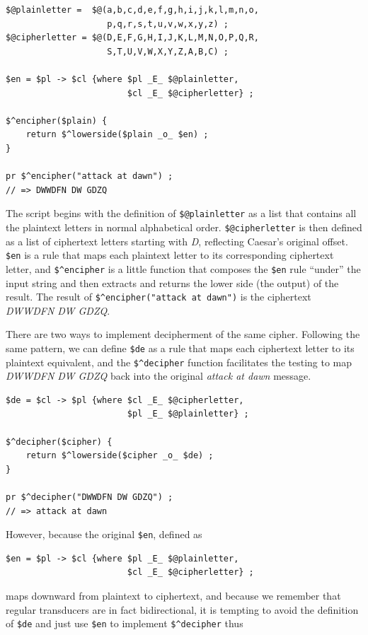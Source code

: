 \begin{Verbatim}
$@plainletter =  $@(a,b,c,d,e,f,g,h,i,j,k,l,m,n,o,
                    p,q,r,s,t,u,v,w,x,y,z) ;
$@cipherletter = $@(D,E,F,G,H,I,J,K,L,M,N,O,P,Q,R,
                    S,T,U,V,W,X,Y,Z,A,B,C) ;

$en = $pl -> $cl {where $pl _E_ $@plainletter,
                        $cl _E_ $@cipherletter} ;

$^encipher($plain) {
    return $^lowerside($plain _o_ $en) ;
}

pr $^encipher("attack at dawn") ;
// => DWWDFN DW GDZQ
\end{Verbatim}



The script begins with the definition of \texttt{\$@plainletter} as a list that contains all the plaintext letters in
normal alphabetical order.  \texttt{\$@cipherletter} is then defined as a list of ciphertext letters starting with \emph{D},
reflecting Caesar's original offset.
\texttt{\$en} is a rule that maps each plaintext letter to its corresponding ciphertext letter, and \verb!$^encipher! is a
little function that composes the \verb!$en! rule ``under'' the input string and then extracts and returns the lower side
(the output) of the result.  The result of \verb!$^encipher("attack at dawn")! is the ciphertext \emph{DWWDFN DW GDZQ}.

There are two ways to implement decipherment of the same cipher.  Following the same pattern, we can define \verb!$de! as
a rule that maps each ciphertext letter to its plaintext equivalent, and the \verb!$^decipher! function facilitates the
testing to map \emph{DWWDFN DW GDZQ} back into the original \emph{attack at dawn} message.

\begin{Verbatim}
$de = $cl -> $pl {where $cl _E_ $@cipherletter,
                        $pl _E_ $@plainletter} ;

$^decipher($cipher) {
    return $^lowerside($cipher _o_ $de) ;
}

pr $^decipher("DWWDFN DW GDZQ") ;
// => attack at dawn
\end{Verbatim}

However, because the original \verb!$en!, defined as


\begin{Verbatim}
$en = $pl -> $cl {where $pl _E_ $@plainletter,
                        $cl _E_ $@cipherletter} ;
\end{Verbatim}

\noindent
maps downward from plaintext to ciphertext, and because we remember that regular transducers are in fact bidirectional, it
is tempting to avoid the definition of \verb!$de! and just use \verb!$en! to implement \verb!$^decipher! thus


